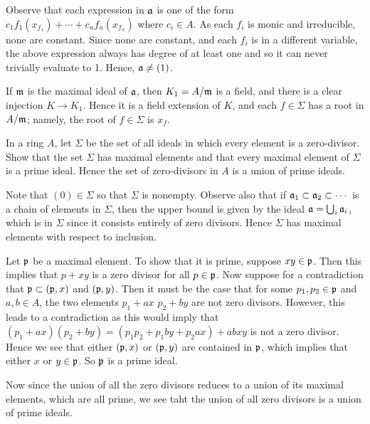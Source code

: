 \documentclass[10pt]{amsart}
\begin{document}
\begin{solution}
    Observe that each expression in $\mathfrak{a}$ is one of the form 
    $c_1f_1(x_{f_1}) + \cdots + c_nf_n(x_{f_n})$
    where $c_i \in A$. As each $f_i$ is monic and irreducible, none are constant. 
    Since none are constant, and each $f_i$ is in a different variable, the above expression 
    always has degree of at least one and so it
    can never trivially evaluate to 1. Hence, $\mathfrak{a} \ne (1)$. 

    If $\mathfrak{m}$ is the maximal ideal of $\mathfrak{a}$, then $K_1 = A/\mathfrak{m}$ is a field, 
    and there is a clear injection $K \to K_1$. Hence it is a field extension of $K$, and 
    each $f \in \Sigma$ has a root in $A/\mathfrak{m}$; namely, the root of $f \in \Sigma$ is 
    $x_f$. 
\end{solution}

\begin{exercise}
    In a ring $A$, let $\Sigma$ be the set of all ideals in which every element is a zero-divisor. 
    Show that the set $\Sigma$ has maximal elements and that every maximal element of $\Sigma$ is a prime ideal. 
    Hence the set of zero-divisors in $A$ is a union of prime ideals.
\end{exercise}

\begin{solution}
    Note that $(0) \in \Sigma$ so that $\Sigma$ is nonempty. 
    Observe also that if $\mathfrak{a}_1 \subset \mathfrak{a}_2 \subset \cdots$ is a chain of elements in 
    $\Sigma$, then the upper bound is given by the ideal $\mathfrak{a} = \bigcup_{i} \mathfrak{a}_i$, which is 
    in $\Sigma$ since it consists entirely of zero divisors. 
    Hence $\Sigma$ has maximal elements with respect to inclusion. 

    Let $\mathfrak{p}$ be a maximal element. To show that it is prime, suppose $xy \in \mathfrak{p}$. 
    Then this implies that $p + xy$ is a zero divisor for all $p \in \mathfrak{p}$. Now suppose for a 
    contradiction that $\mathfrak{p} \subset (\mathfrak{p}, x)$ and $(\mathfrak{p}, y)$. Then it must be the case that 
    for some $p_1, p_2 \in \mathfrak{p}$ and $a, b \in A$, the two elements 
    $p_1 + ax $ $ p_2 + by$ are not zero divisors. 
    However, this leads to a contradiction as this would imply that 
    $(p_1 + ax)(p_2 + by) = (p_1p_2 + p_1by + p_2ax) + abxy$ is not a zero divisor. Hence we see 
    that either $(\mathfrak{p}, x)$ or $(\mathfrak{p}, y)$ are contained in $\mathfrak{p}$, which implies that 
     either $x$ or $y \in \mathfrak{p}$. So $\mathfrak{p}$ is a prime ideal. 

    Now since the union of all the zero divisors reduces to a union of its maximal elements, 
    which are all prime, we see taht the union of all zero divisors is a union of prime ideals. 

\end{solution}
\end{document}
